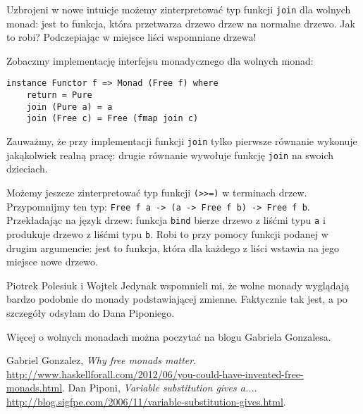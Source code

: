 \documentclass{article}[12pt]
\begin{document}
Uzbrojeni w nowe intuicje możemy zinterpretować typ funkcji \texttt{join} dla
wolnych monad: jest to funkcja, która przetwarza drzewo drzew na normalne drzewo.
Jak to robi? Podczepiając w miejsce liści wspomniane drzewa!

Zobaczmy implementację interfejsu monadycznego dla wolnych monad:
\begin{verbatim}
instance Functor f => Monad (Free f) where
    return = Pure
    join (Pure a) = a
    join (Free c) = Free (fmap join c)
\end{verbatim}

Zauważmy, że przy implementacji funkcji \texttt{join} tylko pierwsze równanie
wykonuje jakąkolwiek realną pracę: drugie równanie wywołuje funkcję \texttt{join}
na swoich dzieciach.

Możemy jeszcze zinterpretować typ funkcji \texttt{(>>=)} w terminach drzew. Przypomnijmy
ten typ: \texttt{Free f a -> (a -> Free f b) -> Free f b}. Przekładając na język drzew:
funkcja \texttt{bind} bierze drzewo z liśćmi typu \texttt{a} i produkuje drzewo z liśćmi
typu \texttt{b}. Robi to przy pomocy funkcji podanej w drugim argumencie: jest to funkcja,
która dla każdego z liści wstawia na jego miejsce nowe drzewo.

Piotrek Polesiuk i Wojtek Jedynak wspomnieli mi, że wolne monady wyglądają bardzo podobnie
do monady podstawiającej zmienne. Faktycznie tak jest, a po szczegóły odsyłam do Dana
Piponiego\cite{subst}.

Więcej o wolnych monadach można poczytać na blogu Gabriela Gonzalesa\cite{free}.

\begin{thebibliography}{9}
        Gabriel Gonzalez,
        \emph{Why free monads matter}.
        \url{http://www.haskellforall.com/2012/06/you-could-have-invented-free-monads.html}.
        Dan Piponi,
        \emph{Variable substitution gives a...}.
        \url{http://blog.sigfpe.com/2006/11/variable-substitution-gives.html}.
\end{thebibliography}
\end{document}
